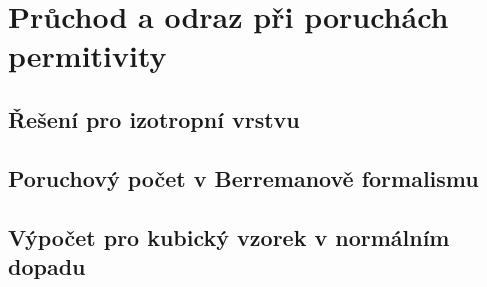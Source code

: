 \section{Průchod a odraz při poruchách permitivity}
\label{app:berreman}

\subsection*{Řešení pro izotropní vrstvu}

\subsection*{Poruchový počet v Berremanově formalismu}

\subsection*{Výpočet pro kubický vzorek v normálním dopadu}
